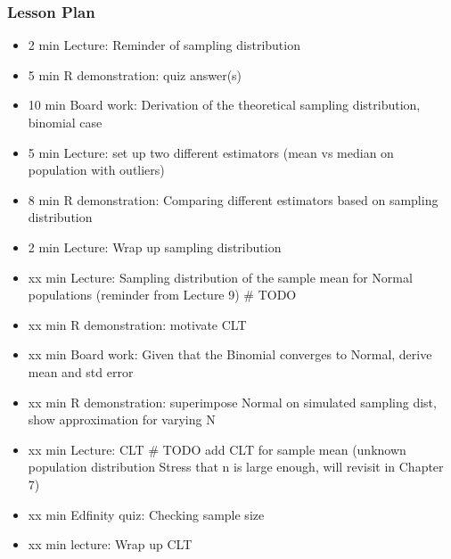 

\begin{frame}
\frametitle{Lesson Plan}
\begin{itemize}
    \item 2 min Lecture: Reminder of sampling distribution
    \item 5 min R demonstration: quiz answer(s)
    \item 10 min Board work: Derivation of the theoretical sampling distribution, binomial case
    \item 5 min Lecture: set up two different estimators (mean vs median on population with outliers) 
    \item 8 min R demonstration: Comparing different estimators based on sampling distribution 
    \item 2 min Lecture: Wrap up sampling distribution

    \item xx min Lecture: Sampling distribution of the sample mean for Normal populations (reminder from Lecture 9) # TODO
    \item xx min R demonstration: motivate CLT
    \item xx min Board work: Given that the Binomial converges to Normal, derive mean and std error
    \item xx min R demonstration: superimpose Normal on simulated sampling dist, show approximation for varying N
    \item xx min Lecture: CLT # TODO add CLT for sample mean (unknown population distribution Stress that n is large enough, will revisit in Chapter 7)
    \item xx min Edfinity quiz: Checking sample size
    \item xx min lecture: Wrap up CLT
 \end{itemize}
\end{frame}
    


